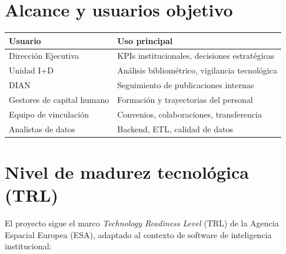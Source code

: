 \documentclass[12pt,a4paper]{report}
\begin{document}
\section{Alcance y usuarios objetivo}

\begin{tabular}{L{5.5cm}L{8cm}}
  \toprule
  \textbf{Usuario} & \textbf{Uso principal} \\
  \midrule
  Dirección Ejecutiva & KPIs institucionales, decisiones estratégicas \\
  Unidad I+D & Análisis bibliométrico, vigilancia tecnológica \\
  DIAN & Seguimiento de publicaciones internas \\
  Gestores de capital humano & Formación y trayectorias del personal \\
  Equipo de vinculación & Convenios, colaboraciones, transferencia \\
  Analistas de datos & Backend, ETL, calidad de datos \\
  \bottomrule
\end{tabular}

\section{Nivel de madurez tecnológica (TRL)}

El proyecto sigue el marco \textit{Technology Readiness Level} (TRL) de la Agencia Espacial Europea (ESA), adaptado al contexto de software de inteligencia institucional:
\end{document}
